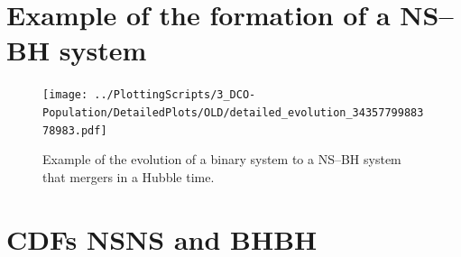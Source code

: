 \documentclass[twocolumn]{aastex63}
\newcommand\bhnsSingle{BHNS\xspace}
\begin{document}




\section{Example of the formation of a  NS--BH system }
\label{app-example-of-evolution-NS-BH-system}
\begin{figure}
    \centering
\texttt{[image: ../PlottingScripts/3\_DCO-Population/DetailedPlots/OLD/detailed\_evolution\_3435779988378983.pdf]} %
    \caption{Example of the evolution of a binary system to a NS--BH system that mergers in a Hubble time.}%
    \label{fig:Detailed-evolution-NSBH-optimistic-CE}
\end{figure}
%




\section{CDFs \ac{NSNS} and BHBH}
\label{sec:app-BHBHandNSNS_CDF}
%



%


\end{document}
